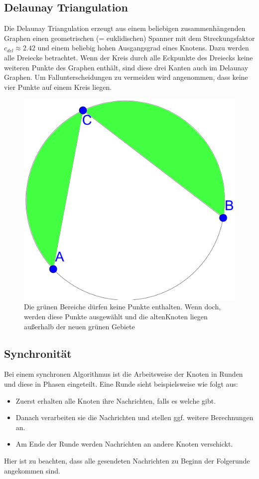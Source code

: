 \documentclass[a4paper,twoside]{IEEEtran}
\begin{document}
\subsection{Delaunay Triangulation}
Die Delaunay Triangulation erzeugt aus einem beliebigen zusammenhängenden Graphen einen geometrischen (= euklidischen) Spanner mit dem Streckungsfaktor $c_{del} \approx 2.42 $ und einem beliebig hohen Ausgangsgrad eines Knotens. 
Dazu werden alle Dreiecke betrachtet.
Wenn der Kreis durch alle Eckpunkte des Dreiecks keine weiteren Punkte des Graphen enthält, sind diese drei Kanten auch im Delaunay Graphen. 
Um Fallunterscheidungen zu vermeiden wird angenommen, dass keine vier Punkte auf einem Kreis liegen. 
\begin{figure}[h!]
\centering
\includegraphics[width=1\linewidth]{2-3.eps}
\caption{Die grünen Bereiche dürfen keine Punkte enthalten. Wenn doch, werden diese Punkte ausgewählt und die \glqq alten\grqq \space Knoten liegen außerhalb der neuen grünen Gebiete}
\label{fig:2-3}
\end{figure}


\subsection{Synchronität}
Bei einem synchronen Algorithmus ist die Arbeitsweise der Knoten in Runden und diese in Phasen eingeteilt. 
Eine Runde sieht beispielsweise wie folgt aus:
\begin{itemize}
\item Zuerst erhalten alle Knoten ihre Nachrichten, falls es welche gibt.
\item Danach verarbeiten sie die Nachrichten und stellen ggf. weitere Berechnungen an.
\item Am Ende der Runde werden Nachrichten an andere Knoten verschickt.
\end{itemize}
Hier ist zu beachten, dass alle gesendeten Nachrichten zu Beginn der Folgerunde angekommen sind.
\end{document}
